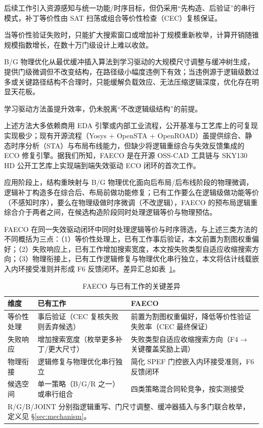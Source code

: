 \documentclass[journal]{IEEEtran}
\begin{document}
后续工作引入资源感知\cite{jiang2016resource}与统一功能/时序目标\cite{lin2011simult,luo2016unified}，但仍采用“先构造、后验证”的串行模式，补丁等价性由 SAT 扫荡或组合等价性检查（CEC）复核保证\cite{mishchenko2006sat,zhong2024stp}。

当等价性验证失败时，只能扩大搜索窗口或增加补丁规模重新枚举\cite{zhuo2018patch}，计算开销随锥规模指数增长，在数十万门级设计上难以收敛。

B/G 物理优化从最优缓冲插入算法\cite{liang2012buffer}到学习驱动的大规模尺寸调整与缓冲树生成\cite{liu2021rlsizer,huang2025phys,chen2024aito,zhang2025buffalo}，提供门级微调但不改变结构，在路径级小幅度违例下有效；当违例源于逻辑级数过多或关键路径结构不合理时，只能缓解负载效应、无法压缩逻辑深度，优化存在明显天花板\cite{liu2021rlsizer,huang2025phys}。

学习驱动方法\cite{chen2024aito,zhang2025buffalo}虽提升效率，仍未脱离“不改逻辑级结构”的前提。

上述方法大多依赖商用 EDA 引擎或内部工业流程，公开基准与工艺库上的可复现实现极少；现有开源流程（Yosys + OpenSTA + OpenROAD）虽提供综合、静态时序分析（STA）与布局布线能力，但缺少将逻辑重综合与失效反馈集成的 ECO 修复引擎。据我们所知，FAECO 是在开源 OSS-CAD 工具链与 SKY130 HD 公开工艺库上实现端到端失效驱动 ECO 闭环的首次工作。

应用阶段上，结构重映射与 B/G 物理优化面向后布局/后布线阶段的物理微调，逻辑补丁构造多在综合后、布局前做功能修复；已有工作要么在逻辑级做功能等价（不感知时序），要么在物理级做时序微调（不改逻辑），FAECO 的预布局逻辑重综合介于两者之间，在候选构造阶段同时处理逻辑等价与物理预估。

FAECO 在同一失效驱动闭环中同时处理逻辑等价与时序筛选，与上述三类方法的不同概括为三点：（1）等价性处理上，已有工作事后验证，本文前置为割图权重偏好；（2）失败响应上，已有工作增加搜索宽度，本文按失败类型自适应收缩搜索方向；（3）物理衔接上，已有工作逻辑修复与物理优化串行独立，本文将估计线载嵌入内环接受准则并形成 F6 反馈闭环。差异汇总如表~\ref{tab:related_diff}。

\begin{table}[!t]
\centering
\caption{FAECO 与已有工作的关键差异}
\label{tab:related_diff}
\footnotesize
\setlength{\tabcolsep}{3pt}
\begin{tabular}{p{2.2cm}p{2.8cm}p{3.2cm}}
\toprule
\textbf{维度} & \textbf{已有工作} & \textbf{FAECO} \\
\midrule
等价性处理 & 事后验证（CEC 复核失败则丢弃候选） & 前置为割图权重偏好，降低等价性验证失败率（CEC 最终保证） \\
失败响应 & 增加搜索宽度（枚举更多补丁/更大尺寸） & 失败类型自适应收缩搜索方向（F4$\to$关键覆盖奖励上调） \\
物理衔接 & 逻辑修复与物理优化串行独立 & 简化 SPEF 门控嵌入内环接受准则，F6 反馈闭环 \\
候选空间 & 单一策略（B/G/R 之一）或串行组合 & 四类策略混合同轮竞争，按实测接受 \\
\bottomrule
\multicolumn{3}{p{8.0cm}}{\footnotesize R/G/B/JOINT 分别指逻辑重写、门尺寸调整、缓冲器插入与多门联合枚举，定义见 \S\ref{sec:mechanism}。}\\
\end{tabular}
\end{table}
\end{document}
